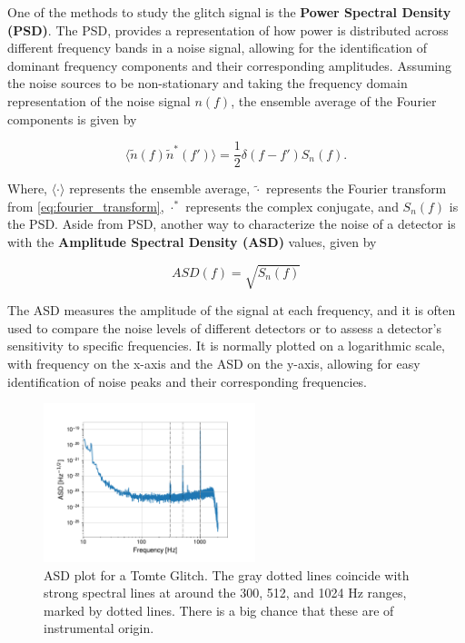 \documentclass[12pt]{article}
\begin{document}

\noindent One of the  methods to study the glitch signal is the \textbf{Power Spectral Density (PSD)}. The PSD, provides a representation of how power is distributed across different frequency bands in a noise signal\cite{Oppenheim_2009}, allowing for the identification of dominant frequency components and their corresponding amplitudes. Assuming the noise sources to be non-stationary and taking the frequency domain representation of the noise signal $n(f)$, the ensemble average of the Fourier components is given by \cite{Li:2013lza}

\begin{equation}
  \langle \tilde{n}(f) \tilde{n}^*(f') \rangle = \frac{1}{2} \delta(f - f') S_n(f).
  \label{eq:psd_relation}
\end{equation}

\medskip
\noindent Where, $\langle \cdot \rangle$ represents the ensemble average, $\tilde{\cdot}$ represents the Fourier transform from \ref{eq:fourier_transform}, $\cdot^\ast$ represents the complex conjugate, and $S_n(f)$ is the PSD. Aside from PSD, another way to characterize the noise of a detector is with the \textbf{Amplitude Spectral Density (ASD)} values, given by

\begin{equation}
  ASD(f) = \sqrt{S_n(f)}
\end{equation}

\noindent The ASD measures the amplitude of the signal at each frequency, and it is often used to compare the noise levels of different detectors or to assess a detector's sensitivity to specific frequencies. It is normally plotted on a logarithmic scale, with frequency on the x-axis and the ASD on the y-axis, allowing for easy identification of noise peaks and their corresponding frequencies.

\begin{figure}[H]
  \centering
  \includegraphics[width=0.55\textwidth]{images/unwhitened_asd.pdf}
  \caption{ASD plot for a Tomte Glitch. The gray dotted lines coincide with strong spectral lines at around the 300, 512, and 1024 Hz ranges, marked by dotted lines. There is a big chance that these are of instrumental origin.}
  \label{fig:asdtomte}
\end{figure}
\end{document}
